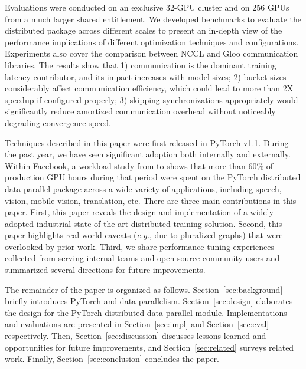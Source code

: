 Evaluations were conducted on an exclusive 32-GPU cluster and on 256 GPUs from a much larger shared entitlement. We developed benchmarks to evaluate the distributed package across different scales to present an in-depth view of the performance implications of different optimization techniques and configurations. Experiments also cover the comparison between NCCL and Gloo communication libraries. The results show that 1) communication is the dominant training latency contributor, and its impact increases with model sizes; 2) bucket sizes considerably affect communication efficiency, which could lead to more than 2X speedup if configured properly; 3) skipping synchronizations appropriately would significantly reduce amortized communication overhead without noticeably degrading convergence speed.


Techniques described in this paper were first released in PyTorch v1.1. During the past year, we have seen significant adoption both internally and externally. %
Within Facebook, a workload study from  to  shows that more than 60\% of production GPU hours during that period were spent on the PyTorch distributed data parallel package across a wide variety of applications, including speech, vision, mobile vision, translation, etc. 
%
There are three main contributions in this paper. First, this paper reveals the design and implementation of a widely adopted industrial state-of-the-art distributed training solution. Second, this paper highlights real-world caveats (\emph{e.g.}, due to pluralized graphs) that were overlooked by prior work. Third, we share performance tuning experiences collected from serving internal teams and open-source community users and summarized several directions for future improvements.


The remainder of the paper is organized as follows. Section~\ref{sec:background} briefly introduces PyTorch and data parallelism. Section~\ref{sec:design} elaborates the design for the PyTorch distributed data parallel module. Implementations and evaluations are presented in Section~\ref{sec:impl} and Section~\ref{sec:eval} respectively. Then, Section~\ref{sec:discussion} discusses lessons learned and opportunities for future improvements, and Section~\ref{sec:related} surveys related work. Finally, Section~\ref{sec:conclusion} concludes the paper.
